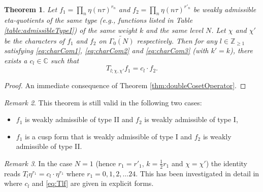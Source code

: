 \documentclass[12pt]{amsart}
\numberwithin{equation}{section}
\theoremstyle{plain}
\newtheorem{thm}{Theorem}[section]
\theoremstyle{definition}
\theoremstyle{remark}
\newtheorem{rema}[thm]{Remark}
\newcommand\numC{\mathbb{C}}
\newcommand\numgeq[2]{\mathbb{#1}_{\geq #2}}
\begin{document}
\begin{thm}
\label{thm:Tlf1f2}
Let $f_1=\prod_{n}\eta(n\tau)^{r_n}$ and $f_2=\prod_{n}\eta(n\tau)^{r'_n}$ be weakly admissible eta-quotients of the same type (e.g., functions listed in Table \ref{table:admissibleTypeI}) of the same weight $k$ and the same level $N$. Let $\chi$ and $\chi'$ be the characters of $f_1$ and $f_2$ on $\widetilde{\Gamma_0(N)}$ respectively. Then for any $l\in\numgeq{Z}{1}$ satisfying \eqref{eq:charCom1}, \eqref{eq:charCom2} and \eqref{eq:charCom3} (with $k'=k$), there exists a $c_l\in\numC$ such that
\begin{equation*}
T_{l;\chi,\chi'}f_1=c_l\cdot f_2.
\end{equation*}
\end{thm}
\begin{proof}
An immediate consequence of Theorem \ref{thm:doubleCosetOperator}.
\end{proof}
\begin{rema}
This theorem is still valid in the following two cases:
\begin{itemize}
  \item $f_1$ is weakly admissible of type II and $f_2$ is weakly admissible of type I,
  \item $f_1$ is a cusp form that is weakly admissible of type I and $f_2$ is weakly admissible of type II.
\end{itemize}
\end{rema}
\begin{rema}
In the case $N=1$ (hence $r_1=r'_1$, $k=\frac{1}{2}r_1$ and $\chi=\chi'$) the identity reads $T_{l}\eta^{r_1}=c_l\cdot\eta^{r_1}$ where $r_1=0,1,2,\dots24$. This has been investigated in detail in \cite[Section 5]{ZZ23} where $c_l$ and \eqref{eq:Tlf} are given in explicit forms.
\end{rema}
\end{document}
